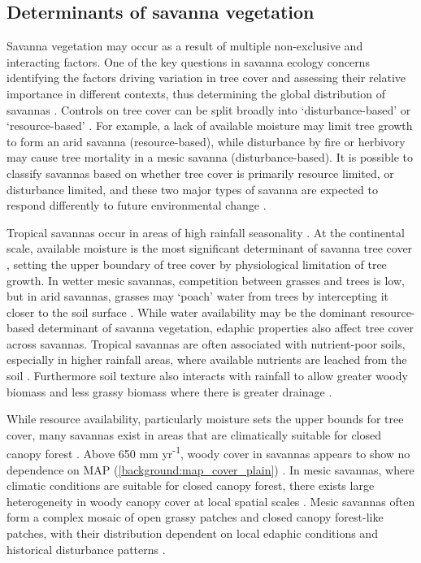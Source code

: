 \begin{refsection}
\subsection{Determinants of savanna vegetation}
\label{background:ssec:determ}

Savanna vegetation may occur as a result of multiple non-exclusive and interacting factors. One of the key questions in savanna ecology concerns identifying the factors driving variation in tree cover and assessing their relative importance in different contexts, thus determining the global distribution of savannas \citep{Higgins2000, Archibald2019}. Controls on tree cover can be split broadly into `disturbance-based' or `resource-based' \citep{Bond2008, Staver2015}. For example, a lack of available moisture may limit tree growth to form an arid savanna (resource-based), while disturbance by fire or herbivory may cause tree mortality in a mesic savanna (disturbance-based). It is possible to classify savannas based on whether tree cover is primarily resource limited, or disturbance limited, and these two major types of savanna are expected to respond differently to future environmental change \citep{Torello2013}. 

Tropical savannas occur in areas of high rainfall seasonality \citep{Lehmann2011}. At the continental scale, available moisture is the most significant determinant of savanna tree cover \citep{Sankaran2005}, setting the upper boundary of tree cover by physiological limitation of tree growth. In wetter mesic savannas, competition between grasses and trees is low, but in arid savannas, grasses may `poach' water from trees by intercepting it closer to the soil surface \citep{Scheiter2007}. While water availability may be the dominant resource-based determinant of savanna vegetation, edaphic properties also affect tree cover across savannas. Tropical savannas are often associated with nutrient-poor soils, especially in higher rainfall areas, where available nutrients are leached from the soil \citep{February2013}. Furthermore soil texture also interacts with rainfall to allow greater woody biomass and less grassy biomass where there is greater drainage \citep{Staver2011}. 

While resource availability, particularly moisture sets the upper bounds for tree cover, many savannas exist in areas that are climatically suitable for closed canopy forest \citep{Sankaran2005, Lehmann2011, Staver2011, Murphy2012}. Above \textapprox{}650 mm yr\textsuperscript{-1}, woody cover in savannas appears to show no dependence on MAP (\autoref{background:map_cover_plain}) \citep{Sankaran2008, Sankaran2005, Good2011}. In mesic savannas, where climatic conditions are suitable for closed canopy forest, there exists large heterogeneity in woody canopy cover at local spatial scales \citep{Dantas2015}. Mesic savannas often form a complex mosaic of open grassy patches and closed canopy forest-like patches, with their distribution dependent on local edaphic conditions and historical disturbance patterns \citep{Staver2011}. 


\end{refsection}
